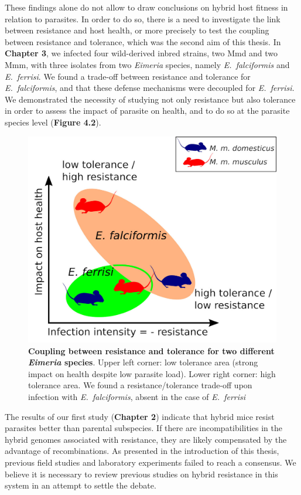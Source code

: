 \par
These findings alone do not allow to draw conclusions on hybrid host fitness in relation to parasites. In order to do so, there is a need to investigate the link between resistance and host health, or more precisely to test the coupling between resistance and tolerance, which was the second aim of this thesis. In \textbf{Chapter 3}, we infected four wild-derived inbred strains, two Mmd and two Mmm, with three isolates from two \textit{Eimeria} species, namely \textit{E.~falciformis} and \textit{E.~ferrisi}. We found a trade-off between resistance and tolerance for \textit{E.~falciformis}, and that these defense mechanisms were decoupled for \textit{E.~ferrisi}. We demonstrated the necessity of studying not only resistance but also tolerance in order to assess the impact of parasite on health, and to do so at the parasite species level (\textbf{Figure 4.2}). 

\begin{figure}[H]
	\centering
	\includegraphics[width=.5\linewidth,height=\textheight,keepaspectratio]{images/4discussion/Figure4.jpeg}
	\caption{\textbf{Coupling between resistance and tolerance for two different \textit{Eimeria} species}. Upper left corner: low tolerance area (strong impact on health despite low parasite load). Lower right corner: high tolerance area. We found a resistance/tolerance trade-off upon infection with \textit{E.~falciformis}, absent in the case of \textit{E.~ferrisi}}
\end{figure}

The results of our first study (\textbf{Chapter 2}) indicate that hybrid mice resist parasites better than parental subspecies. If there are incompatibilities in the hybrid genomes associated with resistance, they are likely compensated by the advantage of recombinations. As presented in the introduction of this thesis, previous field studies and laboratory experiments failed to reach a consensus. We believe it is necessary to review previous studies on hybrid resistance in this system in an attempt to settle the debate.

